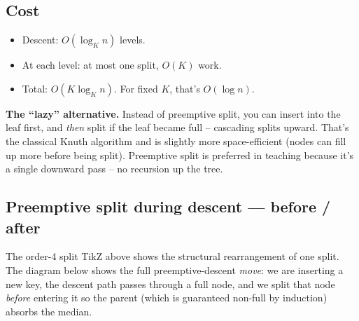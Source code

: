 \documentclass[11pt]{article}
\begin{document}
\subsection*{Cost}

\begin{itemize}[leftmargin=*]
    \item Descent: $O(\log_K n)$ levels.
    \item At each level: at most one split, $O(K)$ work.
    \item Total: $O(K \log_K n)$. For fixed $K$, that's $O(\log n)$.
\end{itemize}

\begin{warnbox}
\textbf{The ``lazy'' alternative.} Instead of preemptive split, you can insert into the leaf first, and \emph{then} split if the leaf became full -- cascading splits upward. That's the classical Knuth algorithm and is slightly more space-efficient (nodes can fill up more before being split). Preemptive split is preferred in teaching because it's a single downward pass -- no recursion up the tree.
\end{warnbox}

\subsection*{Preemptive split during descent --- before / after}

The order-4 split TikZ above shows the structural rearrangement of
one split. The diagram below shows the full preemptive-descent
\emph{move}: we are inserting a new key, the descent path passes
through a full node, and we split that node \emph{before} entering
it so the parent (which is guaranteed non-full by induction) absorbs
the median.
\end{document}
